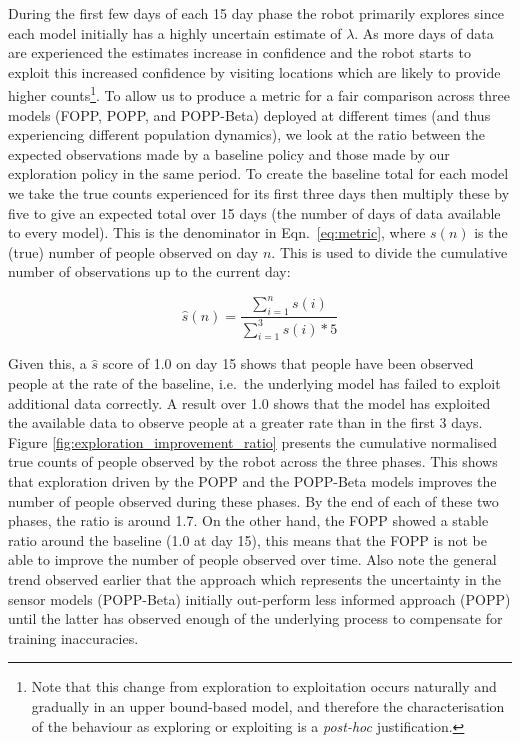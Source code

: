 During the first few days of each 15 day phase the robot primarily explores since each model initially has a highly uncertain estimate of $\lambda$. As more days of data are experienced the estimates increase in confidence and the robot starts to exploit this increased confidence by visiting locations which are likely to provide higher counts\footnote{Note that this change from exploration to exploitation occurs naturally and gradually in an upper bound-based model, and therefore the characterisation of the behaviour as exploring or exploiting is a \emph{post-hoc} justification.}.
% 
To allow us to produce a metric for a fair comparison across three models (FOPP, POPP, and POPP-Beta) deployed at different times (and thus experiencing different population dynamics), we look at the ratio between the expected observations made by a baseline policy and those made by our exploration policy in the same period. 
% 
To create the baseline total for each model we take the true counts experienced for its first three days then multiply these by five to give an expected total over 15 days (the number of days of data available to every model). This is the denominator in Eqn.~\ref{eq:metric}, where $s(n)$ is the (true) number of people observed on day $n$. This is used to divide the cumulative number of observations up to the current day:

\begin{equation}
	\label{eq:metric}
\hat{s}(n) = \frac{\displaystyle\sum_{i=1}^{n} s(i)}{\displaystyle\sum_{i=1}^{3} s(i) * 5}
\end{equation}

\noindent Given this, a $\hat{s}$ score of 1.0 on day 15 shows that people have been observed people at the rate of the baseline, i.e.\ the underlying model has failed to exploit additional data correctly. A result over 1.0 shows that the model has exploited the available data to observe people at a greater rate than in the first 3 days. 
% 
Figure \ref{fig:exploration_improvement_ratio} presents the cumulative normalised true counts of people observed by the robot across the three phases. This shows that exploration driven by the POPP and the POPP-Beta models improves the number of people observed during these phases. By the end of each of these two phases, the ratio is around 1.7. On the other hand, the FOPP showed a stable ratio around the baseline (1.0 at day 15), this means that the FOPP is not be able to improve the number of people observed over time. 
% 
Also note the general trend observed earlier that the approach which represents the uncertainty in the sensor models (POPP-Beta) initially out-perform less informed approach (POPP) until the latter has observed enough of the underlying process to compensate for training inaccuracies. 

